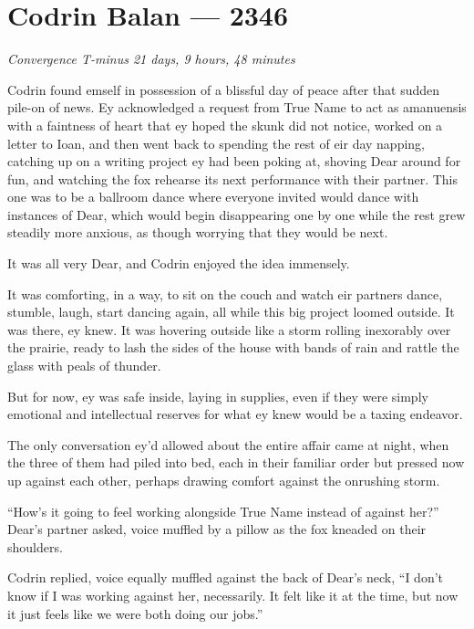 \hypertarget{codrin-balan-2346}{%
\chapter{Codrin Balan — 2346}}

\begin{center}
\emph{Convergence T-minus 21 days, 9 hours, 48 minutes}
\end{center}

\noindent Codrin found emself in possession of a blissful day of peace after that sudden pile-on of news. Ey acknowledged a request from True Name to act as amanuensis with a faintness of heart that ey hoped the skunk did not notice, worked on a letter to Ioan, and then went back to spending the rest of eir day napping, catching up on a writing project ey had been poking at, shoving Dear around for fun, and watching the fox rehearse its next performance with their partner. This one was to be a ballroom dance where everyone invited would dance with instances of Dear, which would begin disappearing one by one while the rest grew steadily more anxious, as though worrying that they would be next.

It was all very Dear, and Codrin enjoyed the idea immensely.

It was comforting, in a way, to sit on the couch and watch eir partners dance, stumble, laugh, start dancing again, all while this big project loomed outside. It was there, ey knew. It was hovering outside like a storm rolling inexorably over the prairie, ready to lash the sides of the house with bands of rain and rattle the glass with peals of thunder.

But for now, ey was safe inside, laying in supplies, even if they were simply emotional and intellectual reserves for what ey knew would be a taxing endeavor.

The only conversation ey'd allowed about the entire affair came at night, when the three of them had piled into bed, each in their familiar order but pressed now up against each other, perhaps drawing comfort against the onrushing storm.

``How's it going to feel working alongside True Name instead of against her?'' Dear's partner asked, voice muffled by a pillow as the fox kneaded on their shoulders.

Codrin replied, voice equally muffled against the back of Dear's neck, ``I don't know if I was working against her, necessarily. It felt like it at the time, but now it just feels like we were both doing our jobs.''

